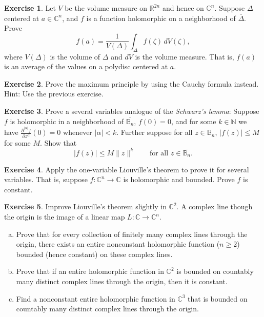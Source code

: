 \documentclass[12pt,openany]{book}
\newcommand{\sabs}[1]{\lvert {#1} \rvert}
\newcommand{\snorm}[1]{\lVert {#1} \rVert}
\newcommand{\C}{{\mathbb{C}}}
\newcommand{\R}{{\mathbb{R}}}
\newcommand{\N}{{\mathbb{N}}}
\newcommand{\bB}{{\mathbb{B}}}
\newcommand{\myindex}[1]{#1\index{#1}}
\theoremstyle{plain}
\theoremstyle{remark}
\theoremstyle{definition}
\newenvironment{exbox}{%
    \def\FrameCommand{\vrule width 1pt \relax\hspace{10pt}}%
    \MakeFramed{\advance\hsize-\width\FrameRestore}%
}{%
    \endMakeFramed
}
\newenvironment{exparts}{%
    \leavevmode\begin{enumerate}[a),noitemsep,topsep=0pt,parsep=0pt,partopsep=0pt]
}{%
    \end{enumerate}
}
\theoremstyle{exercise}
\newtheorem{exercise}{Exercise}[section]
\theoremstyle{example}
\begin{document}
\begin{exbox}
\begin{exercise} \label{exercise:averageDelta}
Let $V$ be the volume measure on $\R^{2n}$ and hence on $\C^n$.
Suppose $\Delta$ centered at $a \in \C^n$, and $f$ is a function holomorphic on
a neighborhood of $\overline{\Delta}$.  Prove
\begin{equation*}
f(a) =
\frac{1}{V(\Delta)}
\int_{\Delta} f(\zeta) \, dV(\zeta) ,
\end{equation*}
where $V(\Delta)$ is the volume of $\Delta$ and $dV$ is the volume measure.
That is, $f(a)$ is an average of the values on a polydisc centered at $a$.
\end{exercise}

\begin{exercise}
Prove the maximum principle by using the Cauchy formula instead.  Hint:
Use the previous exercise.
\end{exercise}

\begin{exercise}
Prove a several variables analogue of the \emph{\myindex{Schwarz's lemma}}:
Suppose $f$ is holomorphic in a neighborhood of $\overline{\bB_n}$,
$f(0) = 0$, and for some $k \in \N$ we have
$\frac{\partial^{\sabs{\alpha}} f}{\partial z^\alpha} (0) =
0$ whenever $\sabs{\alpha} < k$.  Further suppose
for all $z \in \bB_n$,
$\sabs{f(z)} \leq M$ for some $M$.  Show that
\begin{equation*}
\sabs{f(z)} \leq M \snorm{z}^k
\qquad
\text{for all $z \in \overline{\bB_n}$}.
\end{equation*}
\end{exercise}

\begin{exercise}
Apply the one-variable Liouville's theorem to prove it for several variables.
That is, suppose $f \colon \C^n \to \C$ is holomorphic and bounded.
Prove $f$ is constant.
\end{exercise}

\begin{exercise}
\pagebreak[2]
Improve Liouville's theorem slightly in $\C^2$.
A complex line though the origin is
the image of a linear map $L \colon \C \to \C^n$.
\begin{exparts}
\item
Prove that
for every collection of finitely many complex lines through the origin,
there exists an entire nonconstant holomorphic function ($n \geq 2$)
bounded (hence constant) on these complex lines.
\item
Prove that if an entire holomorphic function in $\C^2$ is bounded on
countably many distinct
complex lines through the origin, then it is constant.
\item
Find a nonconstant entire holomorphic function in $\C^3$ that is
bounded on
countably many distinct
complex lines through the origin.
\end{exparts}
\end{exercise}


\end{exbox}
\end{document}
